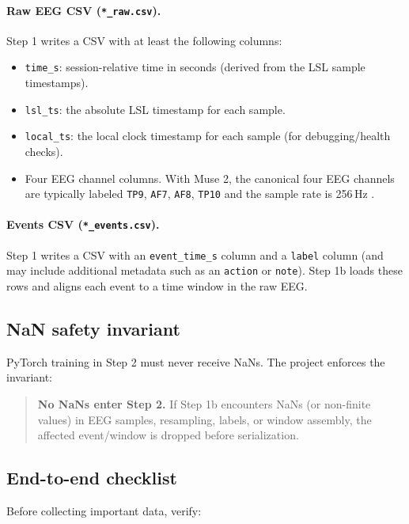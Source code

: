 \documentclass[11pt,openany]{book}
\begin{document}
\paragraph{Raw EEG CSV (\texttt{*\_raw.csv}).}
Step 1 writes a CSV with at least the following columns:
\begin{itemize}
  \item \texttt{time\_s}: session-relative time in seconds (derived from the LSL sample timestamps).
  \item \texttt{lsl\_ts}: the absolute LSL timestamp for each sample.
  \item \texttt{local\_ts}: the local clock timestamp for each sample (for debugging/health checks).
  \item Four EEG channel columns. With Muse 2, the canonical four EEG channels are typically labeled \texttt{TP9}, \texttt{AF7}, \texttt{AF8}, \texttt{TP10} and the sample rate is 256\,Hz \cite{Muse2spec}.
\end{itemize}

\paragraph{Events CSV (\texttt{*\_events.csv}).}
Step 1 writes a CSV with an \texttt{event\_time\_s} column and a \texttt{label} column (and may include additional metadata such as an \texttt{action} or \texttt{note}). Step 1b loads these rows and aligns each event to a time window in the raw EEG.

\subsection{NaN safety invariant}
PyTorch training in Step 2 must never receive NaNs. The project enforces the invariant:

\begin{quote}
\textbf{No NaNs enter Step 2.} If Step 1b encounters NaNs (or non-finite values) in EEG samples, resampling, labels, or window assembly, the affected event/window is dropped before serialization.
\end{quote}

\subsection{End-to-end checklist}
Before collecting important data, verify:
\end{document}
